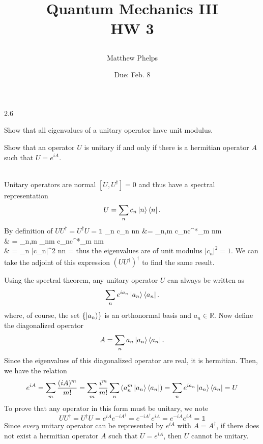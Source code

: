 \documentclass[10pt,letterpaper]{article}
\title{\begin{spacing}{1.2}Quantum Mechanics III\\HW 3\end{spacing}}
\author{Matthew Phelps}
\date{Due: Feb. 8 }
\begin{document}
\maketitle

\benum
  	 \item[2.6]

	\benum
	\item
	Show that all eigenvalues of a unitary operator have unit modulus.
	\item
	Show that an operator $U$ is unitary if and only if there is a hermitian operator $A$ such that $U = e^{iA}$. 
	\\ \\
	\eenum
	
	\benum
	\item 
	Unitary operators are normal $[U,U^\dag] = 0$ and thus have a spectral representation
	\[
		U = \sum_n c_n \ket n\bra n.
	\]
	By definition of $UU^\dag = U^\dag U = \mathds 1$
	\ba
		 \sum_n c_n \ket n\bra n &= \sum_{n,m} c_nc^*_m \ket n\bra m \braket{n|m}\\
		 & = \sum_{n,m} \delta_{nm}  c_nc^*_m \ket n\bra m  \\
		 & = \sum_n |c_n|^2 \ket n\bra n = 
	\ea
	thus the eigenvalues are of unit modulus $|c_n|^2 = 1$. We can take the adjoint of this expression $(UU^\dag)^\dag$
	to find the same result.  \\
	\item 
	Using the spectral theorem, any unitary operator $U$ can always be written as
	\[
		\sum_n e^{i a_n} \ket{a_n}\bra{a_n}.
	\]
	where, of course, the set $\{\ket{a_n}\}$ is an orthonormal basis and $a_n\in \mathbb R$. Now define 
	the diagonalized operator
	\[
		A = \sum_n a_n \ket{a_n} \bra{a_n}.
	\]
	Since the eigenvalues of this diagonalized operator are real, it is hermitian. Then, we have the relation
	\[
		e^{iA} = \sum_m \frac{(iA)^m}{m!} = \sum_m \frac{i^m}{m!}\sum_n \left(a_n^m\ket{a_n}\bra{a_n}\right) 
		= \sum_n e^{ia_n}\ket{a_n}\bra{a_n} = U
	\]
	To prove that any operator in this form must be unitary, we note
	\[
		UU^\dag = U^\dag U = e^{iA}e^{-iA^\dag} =e^{-iA^\dag} e^{iA} = e^{-iA} e^{iA} = \mathds 1
	\]
	Since \emph{every} unitary operator can be represented by $e^{iA}$ with $A=A^\dag$, if there does not exist
	a hermitian operator $A$ such that $U = e^{iA}$, then $U$ cannot be unitary.
	\\ \\
	\eenum 
	
\end{document}
